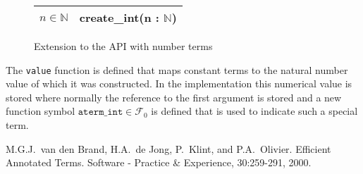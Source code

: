 \documentclass[10pt,a4paper]{article}
\theoremstyle{definition}
\newcommand{\naturalnumbers}{\mathbb{N}}
\newcommand{\functionsymbols}{\mathcal{F}}
\begin{document}
\begin{figure}[H]
  \begin{center}
    \begin{tabular}{|l|l|}
      \hline
      $n \in \naturalnumbers$ & create\_int(n : $\naturalnumbers$) \\ \hline
    \end{tabular}
  \end{center}
  \caption{Extension to the API with number terms}
\end{figure}

\noindent The \texttt{value} function is defined that maps constant terms to the natural number value of which it was constructed.
In the implementation this numerical value is stored where normally the reference to the first argument is stored and a new function symbol $\texttt{aterm\_int} \in \functionsymbols_0$ is defined that is used to indicate such a special term.

\begin{thebibliography}{1}
  M.G.J.\ van den Brand, H.A.\ de Jong, P.\ Klint, and P.A.\ Olivier.
  Efficient Annotated Terms. Software - Practice \& Experience, 30:259-291, 2000.
\end{thebibliography}
\end{document}
